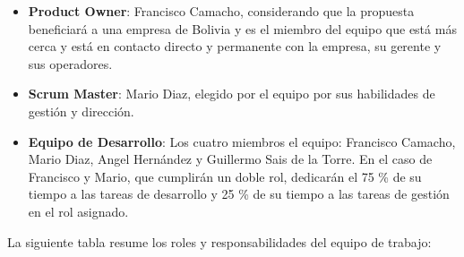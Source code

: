 \begin{itemize}
\item
  \textbf{Product Owner}: Francisco Camacho, considerando que la propuesta beneficiará a una empresa de Bolivia y es el miembro del equipo que está más cerca y está en contacto directo y permanente con la empresa, su gerente y sus operadores.
\item
  \textbf{Scrum Master}: Mario Diaz, elegido por el equipo por sus habilidades de gestión y dirección.
\item
  \textbf{Equipo de Desarrollo}: Los cuatro miembros el equipo: Francisco Camacho, Mario Diaz, Angel Hernández y Guillermo Sais de la Torre. En el caso de Francisco y Mario, que cumplirán un doble rol, dedicarán el 75 \% de su tiempo a las tareas de desarrollo y 25 \% de su tiempo a las tareas de gestión en el rol asignado.
\end{itemize}

La siguiente tabla resume los roles y responsabilidades del equipo de trabajo:

\label{tab:roles-del-equipo-del-trabajo}

